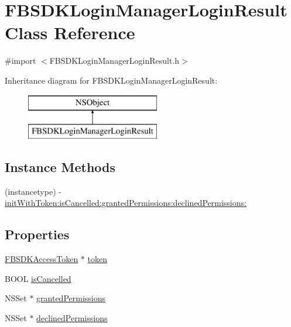 \hypertarget{interface_f_b_s_d_k_login_manager_login_result}{}\section{F\+B\+S\+D\+K\+Login\+Manager\+Login\+Result Class Reference}
\label{interface_f_b_s_d_k_login_manager_login_result}


{\ttfamily \#import $<$F\+B\+S\+D\+K\+Login\+Manager\+Login\+Result.\+h$>$}

Inheritance diagram for F\+B\+S\+D\+K\+Login\+Manager\+Login\+Result\+:\begin{figure}[H]
\begin{center}
\leavevmode
\includegraphics[height=2.000000cm]{interface_f_b_s_d_k_login_manager_login_result}
\end{center}
\end{figure}
\subsection*{Instance Methods}
\begin{DoxyCompactItemize}
\item 
(instancetype) -\/ \hyperlink{interface_f_b_s_d_k_login_manager_login_result_ac5a7c56d925a9b7e0f2956d56d0bf7d3}{init\+With\+Token\+:is\+Cancelled\+:granted\+Permissions\+:declined\+Permissions\+:}
\end{DoxyCompactItemize}
\subsection*{Properties}
\begin{DoxyCompactItemize}
\item 
\hyperlink{interface_f_b_s_d_k_access_token}{F\+B\+S\+D\+K\+Access\+Token} $\ast$ \hyperlink{interface_f_b_s_d_k_login_manager_login_result_a5140b7c91559db23ec845ffb20369dc9}{token}
\item 
B\+O\+O\+L \hyperlink{interface_f_b_s_d_k_login_manager_login_result_a95ae85cb68f693c343232670c3d1ae64}{is\+Cancelled}
\item 
N\+S\+Set $\ast$ \hyperlink{interface_f_b_s_d_k_login_manager_login_result_ae9fe0eaba0b1fddcf8c681c0a1f85e53}{granted\+Permissions}
\item 
N\+S\+Set $\ast$ \hyperlink{interface_f_b_s_d_k_login_manager_login_result_ae64209439a8f3d962ce548d9581af510}{declined\+Permissions}
\end{DoxyCompactItemize}


